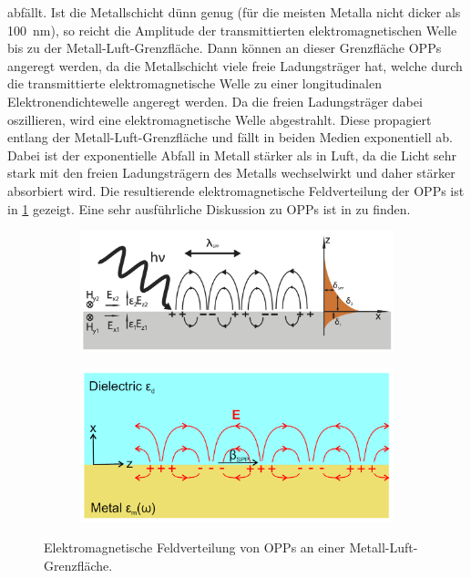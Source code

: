 abfällt. Ist die Metallschicht dünn genug (für die meisten Metalla nicht dicker als \SI{100}{\nm}), so reicht die Amplitude der transmittierten elektromagnetischen
Welle bis zu der Metall-Luft-Grenzfläche. Dann können an dieser Grenzfläche OPPs angeregt werden, da die Metallschicht viele freie Ladungsträger hat, welche
durch die transmittierte elektromagnetische Welle zu einer longitudinalen Elektronendichtewelle angeregt werden. Da die freien Ladungsträger dabei oszillieren, wird
eine elektromagnetische Welle abgestrahlt. Diese propagiert entlang der Metall-Luft-Grenzfläche und fällt in beiden Medien exponentiell ab. Dabei ist der exponentielle
Abfall in Metall stärker als in Luft, da die Licht sehr stark mit den freien Ladungsträgern des Metalls wechselwirkt und daher stärker absorbiert wird.
Die resultierende elektromagnetische Feldverteilung der OPPs ist in \cref{fig:feldverteilung} gezeigt. Eine sehr ausführliche Diskussion zu OPPs ist in \cite{nano} zu finden.
\begin{figure}[H]
    \centering
    \begin{subfigure}{0.4\textwidth}
        \centering
        \includegraphics[width=\linewidth]{../figs/Sketch_of_surface_plasmon}
        \caption{\cite{wiki:sp}}
    \end{subfigure}
    \begin{subfigure}{0.4\textwidth}
        \centering
        \includegraphics[width=\linewidth]{../figs/field_scheme}
        \caption{\cite{linden_photonics}}
    \end{subfigure}
    \caption{Elektromagnetische Feldverteilung von OPPs an einer Metall-Luft-Grenzfläche.}\label{fig:feldverteilung}
\end{figure}
